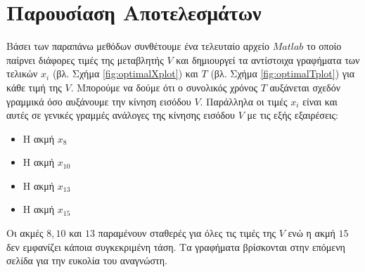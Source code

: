 \documentclass[twocolumn]{report}
\begin{document}
\section*{Παρουσίαση Αποτελεσμάτων}
Βάσει των παραπάνω μεθόδων συνθέτουμε ένα τελευταίο αρχείο $Matlab$ το οποίο παίρνει
διάφορες τιμές της μεταβλητής $V$ και δημιουργεί τα αντίστοιχα γραφήματα των τελικών
$x_i$ (βλ. Σχήμα \ref{fig:optimalXplot}) και $Τ$ (βλ. Σχήμα \ref{fig:optimalTplot})
για κάθε τιμή της $V$. Μπορούμε να δούμε ότι ο συνολικός χρόνος $T$ αυξάνεται σχεδόν 
γραμμικά όσο αυξάνουμε την κίνηση εισόδου $V$. Παράλληλα οι τιμές $x_i$ είναι και αυτές 
σε γενικές γραμμές ανάλογες της κίνησης εισόδου $V$ με τις εξής εξαιρέσεις:
\begin{itemize}
    \item Η ακμή $x_8$
    \item Η ακμή $x_{10}$
    \item Η ακμή $x_{13}$
    \item Η ακμή $x_{15}$
\end{itemize}
Οι ακμές $8, 10$ και $13$ παραμένουν σταθερές για όλες τις τιμές της $V$ ενώ η ακμή
$15$ δεν εμφανίζει κάποια συγκεκριμένη τάση. Τα γραφήματα βρίσκονται στην επόμενη σελίδα
για την ευκολία του αναγνώστη.
\end{document}
